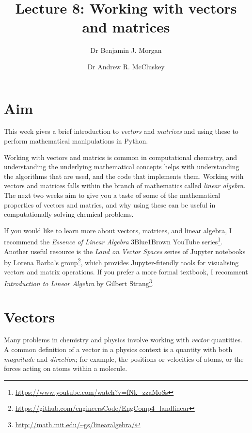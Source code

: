 \documentclass[a4paper]{article}
\title{Lecture 8: Working with vectors and matrices}
\author[1]{Dr Benjamin J. Morgan}
\author[1,2]{Dr Andrew R. McCluskey}
\affil[1]{Department of Chemistry, University of Bath, email: b.j.morgan@bath.ac.uk}
\affil[2]{Diamond Light Source, email: andrew.mccluskey@diamond.ac.uk}
\begin{document}
\maketitle

\section*{Aim}
This week gives a brief introduction to \emph{vectors} and \emph{matrices} and using these to perform mathematical manipulations in Python. 

Working with vectors and matrics is common in computational chemistry, and understanding the underlying mathematical concepts helps with understanding the algorithms that are used, and the code that implements them. Working with vectors and matrices falls within the branch of mathematics called \emph{linear algebra}. The next two weeks aim to give you a taste of some of the mathematical properties of vectors and matrics, and why using these can be useful in computationally solving chemical problems. 

If you would like to learn more about vectors, matrices, and linear algebra, I recommend the \emph{Essence of Linear Algebra} 3Blue1Brown YouTube series\footnote{\url{https://www.youtube.com/watch?v=fNk_zzaMoSs}}. Another useful resource is the \emph{Land on Vector Spaces} series of Jupyter notebooks by Lorena Barba's group\footnote{\url{https://github.com/engineersCode/EngComp4\_landlinear}}, which provides Jupyter-friendly tools for visualising vectors and matrix operations. If you prefer a more formal textbook, I recomment \emph{Introduction to Linear Algebra} by Gilbert Strang\footnote{\url{http://math.mit.edu/\~gs/linearalgebra/}}.

\section{Vectors}
Many problems in chemistry and physics involve working with \emph{vector} quantities. A common definition of a vector in a physics context is a quantity with both \emph{magnitude} and \emph{direction}; for example, the positions or velocities of atoms, or the forces acting on atoms within a molecule.
\end{document}
